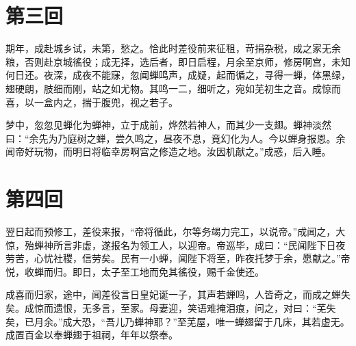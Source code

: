 \documentclass[UTF8, zihao=2, oneside]{ctexbook}
\begin{document}
\chapter{第三回}
期年，成赴城乡试，未第，愁之。恰此时差役前来征租，苛捐杂税，成之家无余粮，否则赴京城徭役；成无择，选后者，即日启程，月余至京师，修房啊宫，未知何日还。夜深，成夜不能寐，忽闻蝉鸣声，成疑，起而循之，寻得一蝉，体黑绿，翅硬朗，肢细而刚，站之如尤物。其鸣一二，细听之，宛如芜初生之音。成惊而喜，以一盒内之，揣于腹兜，视之若子。


梦中，忽忽见蝉化为蝉神，立于成前，烨然若神人，而其少一支翅。蝉神淡然曰：“余先为乃庭树之蝉，尝久鸣之，昼夜不息，竟幻化为人。今以蝉身报恩。余闻帝好玩物，而明日将临幸房啊宫之修造之地。汝因机献之。”成惑，后入睡。

\chapter{第四回}

翌日起而预修工，差役来报，“帝将循此，尔等务竭力完工，以说帝。”成闻之，大惊，殆蝉神所言非虚，遂报名为领工人，以迎帝。帝巡毕，成曰：“民闻陛下日夜劳苦，心忧社稷，信劳矣。民有一小蝉，闻陛下将至，昨夜托梦于余，愿献之。”帝悦，收蝉而归。即日，太子至工地而免其徭役，赐千金使还。


成喜而归家，途中，闻差役言日皇妃诞一子，其声若蝉鸣，人皆奇之，而成之蝉失矣。成惊而遗恨，无多言，至家。母妻迎，笑语难掩泪痕，问之，对曰：“芜失矣，已月余。”成大恐，“吾儿乃蝉神耶？”至芜屋，唯一蝉翅留于几床，其若虚无。成置百金以奉蝉翅于祖祠，年年以祭奉。

\clearpage
\thispagestyle{empty}
\pagestyle{empty}

\vspace*{\fill}


\end{document}
